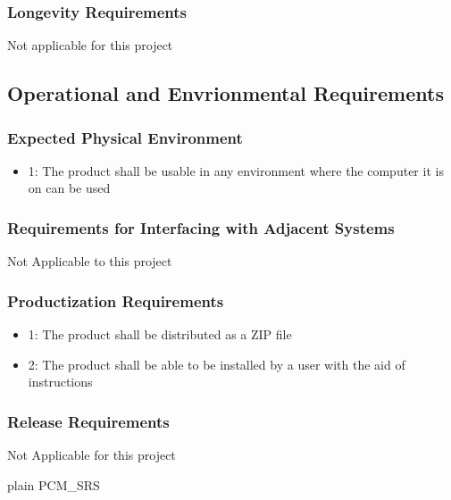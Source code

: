 \documentclass[12pt]{article}
\newcounter{goalnum} %
\begin{document}
\subsubsection*{Longevity Requirements}
Not applicable for this project

\subsection{Operational and Envrionmental Requirements}

\subsubsection*{Expected Physical Environment}
\begin{itemize}
\item 1: The product shall be usable in any environment where the computer it is on can be used
\end{itemize}

\subsubsection*{Requirements for Interfacing with Adjacent Systems}
Not Applicable to this project

\subsubsection*{Productization Requirements}
\begin{itemize}
\item 1: The product shall be distributed as a ZIP file
\item 2: The product shall be able to be installed by a user with the aid of instructions
\end{itemize}

\subsubsection*{Release Requirements}
Not Applicable for this project






 {plain}
 {PCM_SRS}
\end{document}
